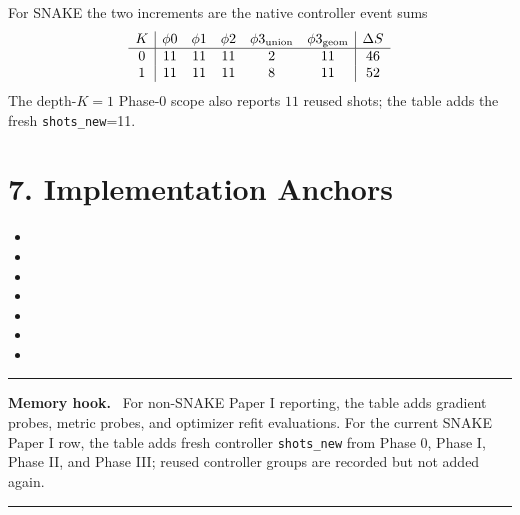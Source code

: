 \documentclass[10pt,twocolumn]{article}
\newcommand{\boxline}{\vspace{2pt}\hrule\vspace{3pt}}
\newenvironment{primerbox}[1]{%
  \boxline\begingroup\raggedright\textbf{#1.}\ }{\par\endgroup\boxline}
\begin{document}
For SNAKE the two increments are the native controller event sums
\[
\begin{array}{c|ccccc|c}
K & \phi0 & \phi1 & \phi2 & \phi3_{\rm union} & \phi3_{\rm geom} & \Delta S\\
\hline
0 & 11 & 11 & 11 & 2 & 11 & 46\\
1 & 11 & 11 & 11 & 8 & 11 & 52
\end{array}
\]
The depth-\(K=1\) Phase-0 scope also reports \(11\) reused shots; the table adds
the fresh \texttt{shots\_new}=11.

\section*{7. Implementation Anchors}

\begin{itemize}
\item \footnotesize{}
\item \footnotesize{}
\item \footnotesize{}
\item \footnotesize{}
\item \footnotesize{}
\item \footnotesize{}
\item \footnotesize{}
\end{itemize}

\begin{primerbox}{Memory hook}
For non-SNAKE Paper I reporting, the table adds gradient probes, metric probes,
and optimizer refit evaluations.  For the current SNAKE Paper I row, the table
adds fresh controller \texttt{shots\_new} from Phase 0, Phase I, Phase II, and
Phase III; reused controller groups are recorded but not added again.
\end{primerbox}
\end{document}
